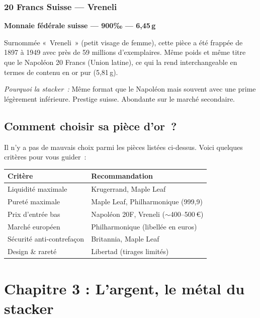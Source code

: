 \documentclass[14pt,a4paper]{extarticle}
\newcommand{\permil}{‰}
\begin{document}
\subsubsection{20 Francs Suisse --- Vreneli}

\textbf{Monnaie fédérale suisse --- 900\permil{} --- 6,45\,g}

Surnommée «~Vreneli~» (petit visage de femme), cette pièce a été frappée de 1897 à 1949 avec près de 59 millions d'exemplaires. Même poids et même titre que le Napoléon 20 Francs (Union latine), ce qui la rend interchangeable en termes de contenu en or pur (5,81\,g).

\textit{Pourquoi la stacker~:} Même format que le Napoléon mais souvent avec une prime légèrement inférieure. Prestige suisse. Abondante sur le marché secondaire.

\subsection{Comment choisir sa pièce d'or~?}

Il n'y a pas de mauvais choix parmi les pièces listées ci-dessus. Voici quelques critères pour vous guider~:

\begin{center}
\begin{tabular}{ll}
\toprule
\textbf{Critère} & \textbf{Recommandation} \\
\midrule
Liquidité maximale & Krugerrand, Maple Leaf \\
Pureté maximale & Maple Leaf, Philharmonique (999,9) \\
Prix d'entrée bas & Napoléon 20F, Vreneli ($\sim$400--500\,€) \\
Marché européen & Philharmonique (libellée en euros) \\
Sécurité anti-contrefaçon & Britannia, Maple Leaf \\
Design \& rareté & Libertad (tirages limités) \\
\bottomrule
\end{tabular}
\end{center}

\newpage

\section{Chapitre 3 : L'argent, le métal du stacker}
\end{document}

